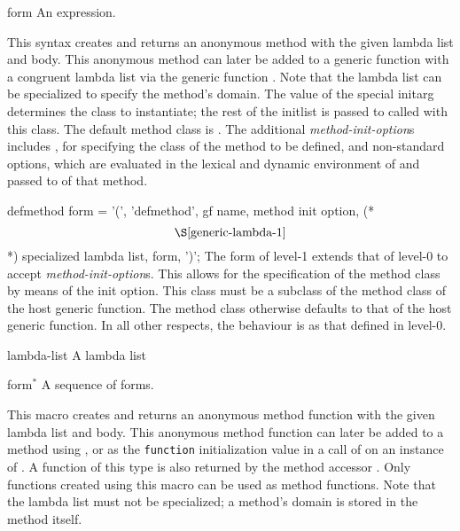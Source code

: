 \begin{optDefinition}
\begin{arguments}
    \item[form] An expression.
\end{arguments}
%
\result%
This syntax creates and returns an anonymous method with the given
lambda list and body.  This anonymous method can later be added to a generic
function with a congruent lambda list via the generic function
.  Note that the lambda list can be specialized to
specify the method's domain.  The value of the special initarg 
determines the class to instantiate; the rest of the initlist is passed to
 called with this class.  The default method class is
.
%
\remarks%
The additional {\em method-init-option\/}s includes , for
specifying the class of the method to be defined, and non-standard
options, which are evaluated in the lexical and dynamic environment of
 and passed to  of that method.

\Syntax
\savesyntax{}\vbox{\small\syntax
defmethod form
   = '(', 'defmethod', gf name,
     {method init option}, (* \[\S\ref{generic-lambda-1}\] *)
     specialized lambda list,
     {form}, ')';
\endsyntax}
%
\remarks%
The  form of level-1 extends that of level-0 to accept
{\em method-init-option\/}s.  This allows for the specification of the
method class by means of the  init option.  This class must
be a subclass of the method class of the host generic function. The
method class otherwise defaults to that of the host generic function.
In all other respects, the behaviour is as that defined in level-0.

%
\begin{arguments}
    \item[lambda-list] A lambda list
    \item[form$^*$] A sequence of forms.
\end{arguments}
%
This macro creates and returns an anonymous method function with the given
lambda list and body. This anonymous method function can later be added to a
method using , or as the {\tt function}
initialization value in a call of  on an instance of
.  A function of this type is also returned by the method
accessor .  Only functions created using this macro
can be used as method functions.  Note that the lambda list must not be
specialized; a method's domain is stored in the method itself.


\end{optDefinition}
